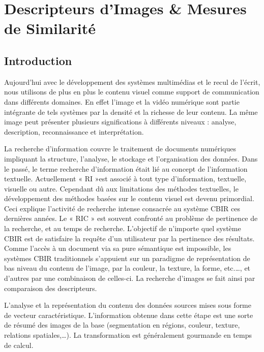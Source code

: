 
\chapter{Descripteurs d'Images \&  Mesures de Similarité} %

\label{ChapterX} %


\section{Introduction}
Aujourd’hui avec le développement des systèmes multimédias et le recul de l’écrit, nous utilisons de plus en plus le contenu visuel comme support de communication dans différents domaines. En effet l’image et la vidéo numérique sont partie intégrante de tels systèmes par la
densité et la richesse de leur contenu. La même image peut présenter plusieurs significations à différents niveaux : analyse, description, reconnaissance et interprétation.

La recherche d’information couvre le traitement de documents numériques impliquant la structure, l’analyse, le stockage et l’organisation des données. Dans le passé, le terme recherche d’information était lié au concept de l’information textuelle. Actuellement « RI »est associé à tout type d’information, textuelle, visuelle ou autre. Cependant dû aux limitations des méthodes textuelles, le développement des méthodes basées sur le contenu visuel est devenu primordial. Ceci explique l’activité de recherche intense consacrée au système CBIR ces dernières années. Le « RIC » est souvent confronté au problème de pertinence de la
recherche, et au temps de recherche. L’objectif de n’importe quel système CBIR est de satisfaire la requête d’un utilisateur par la
pertinence des résultats. Comme l’accès à un document via sa pure sémantique est impossible, les systèmes CBIR traditionnels s’appuient sur un paradigme de représentation de bas niveau du contenu de l’image, par la couleur, la texture, la forme, etc.…, et d’autres par une
combinaison de celles-ci. La recherche d’images se fait ainsi par comparaison des descripteurs.

L’analyse et la représentation du contenu des données sources mises sous forme de vecteur caractéristique. L’information obtenue dans cette étape est une sorte de résumé des images de la base (segmentation en régions, couleur, texture, relations spatiales,…). La transformation
est généralement gourmande en temps de calcul.

